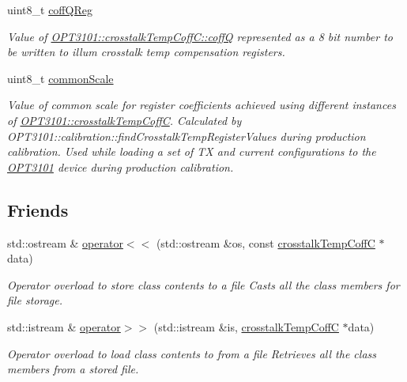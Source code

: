 \begin{DoxyCompactItemize}
uint8\+\_\+t \mbox{\hyperlink{class_o_p_t3101_1_1crosstalk_temp_coff_c_ae45f7932044d4d343f5f4d17ef0264c8}{coff\+Q\+Reg}}
\begin{DoxyCompactList}\small\item\em Value of \mbox{\hyperlink{class_o_p_t3101_1_1crosstalk_temp_coff_c_a468edb62fe09f0117c59ed5c2ec11e3b}{O\+P\+T3101\+::crosstalk\+Temp\+Coff\+C\+::coffQ}} represented as a 8 bit number to be written to illum crosstalk temp compensation registers. \end{DoxyCompactList}\item 
uint8\+\_\+t \mbox{\hyperlink{class_o_p_t3101_1_1crosstalk_temp_coff_c_a0ff621323b7f23672af224efca88e01e}{common\+Scale}}
\begin{DoxyCompactList}\small\item\em Value of common scale for register coefficients achieved using different instances of \mbox{\hyperlink{class_o_p_t3101_1_1crosstalk_temp_coff_c}{O\+P\+T3101\+::crosstalk\+Temp\+CoffC}}. Calculated by O\+P\+T3101\+::calibration\+::find\+Crosstalk\+Temp\+Register\+Values during production calibration. Used while loading a set of TX and current configurations to the \mbox{\hyperlink{namespace_o_p_t3101}{O\+P\+T3101}} device during production calibration. \end{DoxyCompactList}\end{DoxyCompactItemize}
\subsection*{Friends}
\begin{DoxyCompactItemize}
\item 
std\+::ostream \& \mbox{\hyperlink{class_o_p_t3101_1_1crosstalk_temp_coff_c_a97fcdfa432cb48c20b2c436ff6f8d03e}{operator$<$$<$}} (std\+::ostream \&os, const \mbox{\hyperlink{class_o_p_t3101_1_1crosstalk_temp_coff_c}{crosstalk\+Temp\+CoffC}} $\ast$data)
\begin{DoxyCompactList}\small\item\em Operator overload to store class contents to a file Casts all the class members for file storage. \end{DoxyCompactList}\item 
std\+::istream \& \mbox{\hyperlink{class_o_p_t3101_1_1crosstalk_temp_coff_c_a7f47248c703fb5c703bb6256a2c3b54b}{operator$>$$>$}} (std\+::istream \&is, \mbox{\hyperlink{class_o_p_t3101_1_1crosstalk_temp_coff_c}{crosstalk\+Temp\+CoffC}} $\ast$data)
\begin{DoxyCompactList}\small\item\em Operator overload to load class contents to from a file Retrieves all the class members from a stored file. \end{DoxyCompactList}\end{DoxyCompactItemize}


